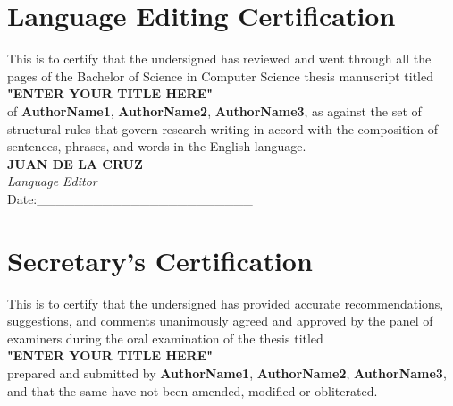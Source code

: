 

\begin{theappendices}

\chapter{Language Editing Certification}
\centering

This is to certify that the undersigned has reviewed and went through all the pages of the Bachelor of Science in Computer Science thesis manuscript titled \\

\textbf{"ENTER YOUR TITLE HERE"} \\


of \textbf{AuthorName1}, \textbf{AuthorName2}, \textbf{AuthorName3}, as against the set of structural rules that govern research writing in accord with the composition of sentences, phrases, and words in the English language.
 \newline \newline \newline \\

\noindent \textbf{JUAN DE LA CRUZ} \\
\textit{Language Editor} \\

Date:\_\_\_\_\_\_\_\_\_\_\_\_\_\_\_\_\_\_\_\_\_\_\_


\chapter{Secretary's Certification}
\centering

This is to certify that the undersigned has provided accurate recommendations, suggestions, and comments unanimously agreed and approved by the panel of examiners during the oral examination of the thesis titled \\ \textbf{"ENTER YOUR TITLE HERE"} \\  prepared and submitted by \textbf{AuthorName1}, \textbf{AuthorName2}, \textbf{AuthorName3}, and that the same have not been amended, modified or obliterated. \newline \newline \newline \\




\end{theappendices}
